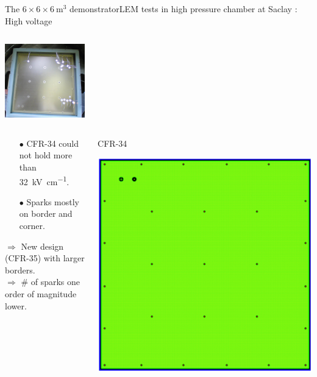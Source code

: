 \documentclass[10pt]{beamer}
\begin{document}
\begin{frame}{The \texorpdfstring{$6 \times 6 \times \SI{6}{\meter\cubed}$}{666} demonstrator}{LEM tests in high pressure chamber at Saclay : High voltage}
\begin{columns}
\begin{column}{0.5\textwidth}
\begin{center}
	    			\includegraphics[height=3.2cm]{figures/666/sparks_35.png}
	    		\end{center}
    		\end{column}
    	\end{columns}\vfill
    	\begin{columns}
    		\begin{column}{0.5\textwidth}
    			\begin{scriptsize}
	    			\begin{itemize}
	    				\item[$\bullet$] CFR-34 could not hold more than \SI{32}{\kilo\volt\per\centi\meter}.
	    				\item[$\bullet$] Sparks mostly on border and corner.
	    			\end{itemize}
	    			$\Rightarrow$ New design (CFR-35) with larger borders.\\
	    			$\Rightarrow$ \# of sparks one order of magnitude lower.
	    		\end{scriptsize}
    		\end{column}\hfill
    		\begin{column}{0.5\textwidth}
    			\begin{minipage}{0.48\textwidth}
    				\centering
    				\begin{scriptsize}
	    				CFR-34
	    			\end{scriptsize}
    				\includegraphics[width=.9\textwidth]{figures/666/CFR-34.png}

\end{minipage}
\end{column}
\end{columns}
\end{frame}
\end{document}
